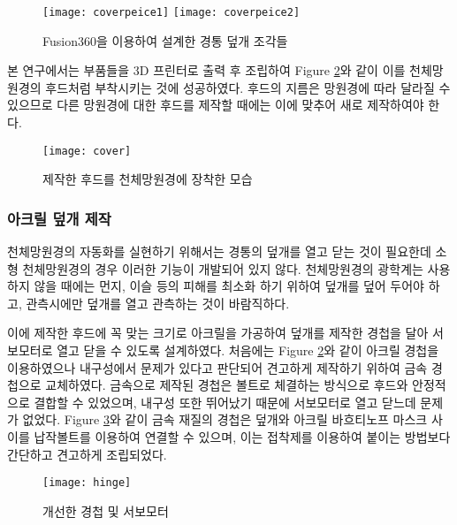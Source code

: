 \begin{figure}[h]
	\begin{center}
		\texttt{[image: coverpeice1]}
		\texttt{[image: coverpeice2]}
	\end{center}
	\caption{Fusion360을 이용하여 설계한 경통 덮개 조각들}
	\label{coverpeice}
\end{figure}

본 연구에서는 부품들을 3D 프린터로 출력 후 조립하여 \textrm{Figure} \ref{cover}와 같이 이를 천체망원경의 후드처럼 부착시키는 것에 성공하였다. 후드의 지름은 망원경에 따라 달라질 수 있으므로 다른 망원경에 대한 후드를 제작할 때에는 이에 맞추어 새로 제작하여야 한다.

\begin{figure}[h]
	\begin{center}
		\texttt{[image: cover]}
	\end{center}
	\caption{제작한 후드를 천체망원경에 장착한 모습}
	\label{cover}
\end{figure}


\subsubsection{아크릴 덮개 제작}

천체망원경의 자동화를 실현하기 위해서는 경통의 덮개를 열고 닫는 것이 필요한데 소형 천체망원경의 경우 이러한 기능이 개발되어 있지 않다. 천체망원경의 광학계는 사용하지 않을 때에는 먼지, 이슬 등의 피해를 최소화 하기 위하여 덮개를 덮어 두어야 하고, 관측시에만 덮개를 열고 관측하는 것이 바람직하다. 

이에 제작한 후드에 꼭 맞는 크기로 아크릴을 가공하여 덮개를 제작한 경첩을 달아 서보모터로 열고 닫을 수 있도록 설계하였다. 처음에는 \textrm{Figure} \ref{cover}와 같이 아크릴 경첩을 이용하였으나 내구성에서 문제가 있다고 판단되어 견고하게 제작하기 위하여 금속 경첩으로 교체하였다. 금속으로 제작된 경첩은 볼트로 체결하는 방식으로 후드와 안정적으로 결합할 수 있었으며, 내구성 또한 뛰어났기 때문에 서보모터로 열고 닫느데 문제가 없었다. \textrm{Figure} \ref{hinge}와 같이 금속 재질의 경첩은 덮개와 아크릴 바흐티노프 마스크 사이를 납작볼트를 이용하여 연결할 수 있으며, 이는 접착제를 이용하여 붙이는 방법보다 간단하고 견고하게 조립되었다.

\begin{figure}[h]
	\begin{center}
		\texttt{[image: hinge]}
	\end{center}
	\caption{개선한 경첩 및 서보모터}
	\label{hinge}
\end{figure}

